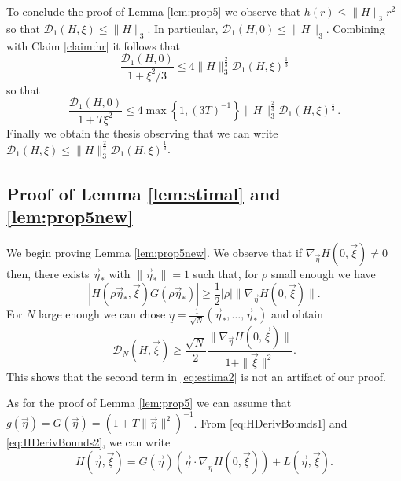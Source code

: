 \documentclass{article}
\newcommand\calD{{\mathcal D}}
\renewcommand\v[1]{\vec{#1}}
\newcommand\set[1]{\left\{ #1 \right\}}
\newcommand\ueta{{\underline \eta}}
\newcommand\vxi{{\vec \xi}}
\newcommand\veta{{\vec \eta}}
\begin{document}
To conclude the proof of Lemma \ref{lem:prop5} we observe that $h(r)\leq \|H\|_3 r^2$ so that $\calD_1(H,\xi)\leq
\|H\|_3$. In particular, $\calD_1(H,0) \leq \|H\|_3.$ Combining with Claim \ref{claim:hr} it follows that 
\[
\frac{\calD_1(H,0)}{1+\xi^2/3}\leq 4\|H\|_3^{\frac23} \calD_1(H,\xi)^{\frac13}
\]
so that
\[
\frac{\calD_1(H,0)}{1+T\xi^2}\leq 4\max\set{1,(3T)^{-1}}\|H\|_3^{\frac23} \calD_1(H,\xi)^{\frac13}\, .
\]
Finally we obtain the thesis observing that we can write $\calD_1(H,\xi)\leq \|H\|_3^{\frac23} \calD_1(H,\xi)^{\frac13}$.


\subsection{Proof of Lemma \ref{lem:stimal} and \ref{lem:prop5new}}

We begin proving Lemma \ref{lem:prop5new}. We observe that if $\nabla_{\veta}H(0,\vxi)\not =0$ then, there exists
$\veta_*$ with $\|\veta_*\|=1$ such that, for $\rho$ small enough we have
\[
|H(\rho\veta_*,\vxi)G(\rho\veta_*)|\geq \frac 12|\rho|\|\nabla_{\veta}H(0,\vxi)\|.
\]
For $N$ large enough we can chose $\ueta=\frac 1{\sqrt N}(\veta_*,\ldots,\veta_*)$ and obtain
\[
\calD_N(H,\vxi)\geq \frac {\sqrt N}2 \frac{\|\nabla_{\veta}H(0,\vxi)\|}{1+\|\vxi\|^2}.
\]
This shows that the second term in \eqref{eq:estima2} is not an artifact of our proof.

As for the proof of Lemma \ref{lem:prop5} we can assume that $g(\v\eta)=G(\v\eta)=(1+T\|\v\eta\|^2)^{-1}$. From
\eqref{eq:HDerivBounds1} and \eqref{eq:HDerivBounds2}, we can write \label{sub:proof prop5new} %
\begin{equation}\label{eq:TaylorExpansion}
H(\vec \eta,\vxi) = G(\vec\eta) (\vec \eta \cdot \nabla_{\vec \eta} H(0,\vxi)) +  L(\vec \eta,\vxi).
\end{equation}
\end{document}
